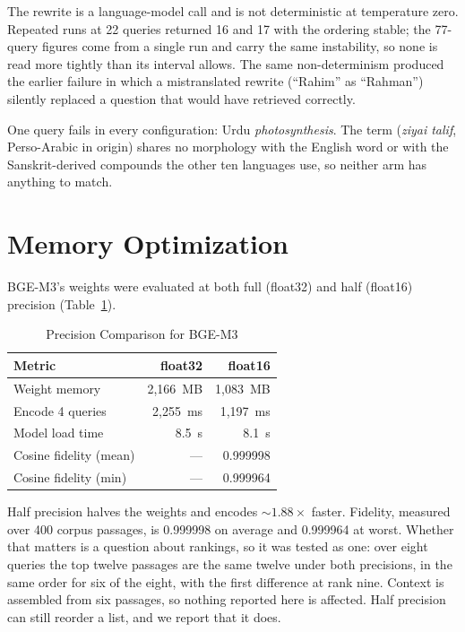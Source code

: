 \ifspringer\else
The rewrite is a language-model call and is not deterministic at temperature zero. Repeated runs at 22 queries returned 16 and 17 with the ordering stable; the 77-query figures come from a single run and carry the same instability, so none is read more tightly than its interval allows. The same non-determinism produced the earlier failure in which a mistranslated rewrite (``Rahim'' as ``Rahman'') silently replaced a question that would have retrieved correctly.
\fi

\ifshort\else One query fails in every configuration: Urdu \emph{photosynthesis}. The term (\textit{ziyai talif}, Perso-Arabic in origin) shares no morphology with the English word or with the Sanskrit-derived compounds the other ten languages use, so neither arm has anything to match.\fi

\section{Memory Optimization}
\label{sec:memory}

\label{sec:precision}
BGE-M3's weights were evaluated at both full (float32) and half (float16) precision (Table~\ref{tab:precision}).

\begin{table}
\caption{Precision Comparison for BGE-M3}
\label{tab:precision}
\centering
\begin{tabular}{@{}lrr@{}}
\toprule
\textbf{Metric} & \textbf{float32} & \textbf{float16} \\
\midrule
Weight memory & 2,166~MB & 1,083~MB \\
Encode 4 queries & 2,255~ms & 1,197~ms \\
Model load time & 8.5~s & 8.1~s \\
Cosine fidelity (mean) & --- & 0.999998 \\
Cosine fidelity (min) & --- & 0.999964 \\
\bottomrule
\end{tabular}
\end{table}

Half precision halves the weights and encodes ${\sim}1.88\times$ faster. Fidelity, measured over 400 corpus passages, is 0.999998 on average and 0.999964 at worst. Whether that matters is a question about rankings, so it was tested as one: over eight queries the top twelve passages are the same twelve under both precisions, in the same order for six of the eight, with the first difference at rank nine. Context is assembled from six passages, so nothing reported here is affected. Half precision can still reorder a list, and we report that it does.


